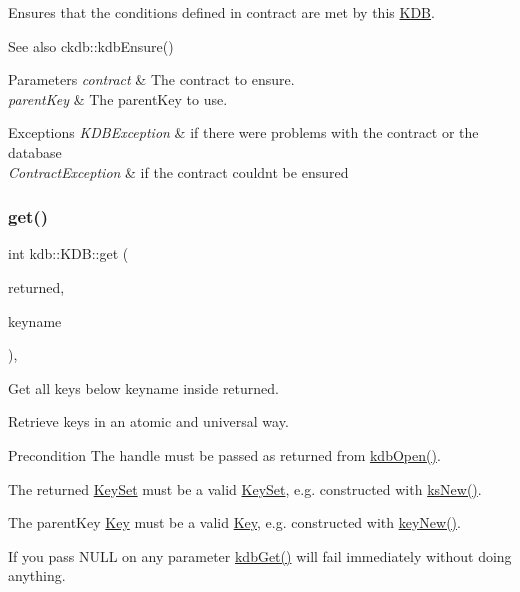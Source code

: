 Ensures that the conditions defined in {\ttfamily contract} are met by this \mbox{\hyperlink{classkdb_1_1KDB}{K\+DB}}. 

\begin{DoxySeeAlso}{See also}
ckdb\+::kdb\+Ensure()
\end{DoxySeeAlso}

\begin{DoxyParams}{Parameters}
{\em contract} & The contract to ensure. \\
\hline
{\em parent\+Key} & The parent\+Key to use.\\
\hline
\end{DoxyParams}

\begin{DoxyExceptions}{Exceptions}
{\em K\+D\+B\+Exception} & if there were problems with the contract or the database \\
\hline
{\em Contract\+Exception} & if the contract couldn\textquotesingle{}t be ensured \\
\hline
\end{DoxyExceptions}
\mbox{\label{classkdb_1_1KDB_a0419ffbc273c89756bc523b4223ec25a}} 
\subsubsection{\texorpdfstring{get()}{get()}\hspace{0.1cm}{\footnotesize\ttfamily [1/2]}}
{\footnotesize\ttfamily int kdb\+::\+K\+D\+B\+::get (\begin{DoxyParamCaption}\item[{\mbox{\hyperlink{classkdb_1_1KeySet}{Key\+Set}} \&}]{returned,  }\item[{std\+::string const \&}]{keyname }\end{DoxyParamCaption})\hspace{0.3cm}{\ttfamily [inline]}, {\ttfamily [virtual]}}



Get all keys below keyname inside returned. 

Retrieve keys in an atomic and universal way. \begin{DoxyPrecond}{Precondition}
The {\ttfamily handle} must be passed as returned from \mbox{\hyperlink{group__kdb_ga6808defe5870f328dd17910aacbdc6ca}{kdb\+Open()}}.

The {\ttfamily returned} \mbox{\hyperlink{classkdb_1_1KeySet}{Key\+Set}} must be a valid \mbox{\hyperlink{classkdb_1_1KeySet}{Key\+Set}}, e.\+g. constructed with \mbox{\hyperlink{group__keyset_ga671e1aaee3ae9dc13b4834a4ddbd2c3c}{ks\+New()}}.

The {\ttfamily parent\+Key} \mbox{\hyperlink{classkdb_1_1Key}{Key}} must be a valid \mbox{\hyperlink{classkdb_1_1Key}{Key}}, e.\+g. constructed with \mbox{\hyperlink{group__key_gad23c65b44bf48d773759e1f9a4d43b89}{key\+New()}}.
\end{DoxyPrecond}
If you pass N\+U\+LL on any parameter \mbox{\hyperlink{group__kdb_ga28e385fd9cb7ccfe0b2f1ed2f62453a1}{kdb\+Get()}} will fail immediately without doing anything.

